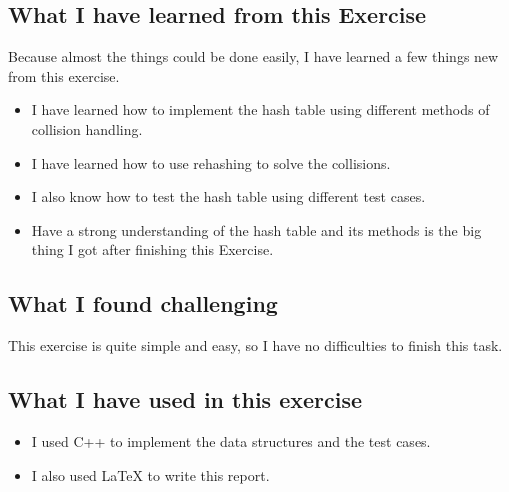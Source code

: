 \documentclass[a4paper,12pt]{report}
\begin{document}
\subsection{What I have learned from this Exercise}
\begin{flushleft}
  Because almost the things could be done easily, I have learned a few things new from this exercise.
  \begin{itemize}
    \item I have learned how to implement the hash table using different methods of collision handling.
    \item I have learned how to use rehashing to solve the collisions.
    \item I also know how to test the hash table using different test cases.
    \item Have a strong understanding of the hash table and its methods is the big thing I got after finishing this Exercise.
  \end{itemize}
\end{flushleft}
\subsection{What I found challenging}
\begin{flushleft}
  This exercise is quite simple and easy, so I have no difficulties to finish this task.
\end{flushleft}
\subsection{What I have used in this exercise}
\begin{itemize}
  \item I used C++ to implement the data structures and the test cases.
  \item I also used \LaTeX{} to write this report.
\end{itemize}
\end{document}
